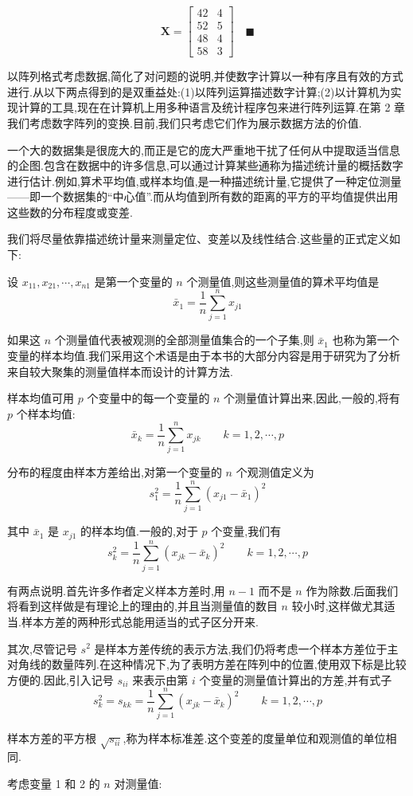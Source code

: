 \[
\bm{X} =
\begin{bmatrix}
42 & 4 \\
52 & 5 \\
48 & 4 \\
58 & 3
\end{bmatrix}
\quad\blacksquare
\]

以阵列格式考虑数据,简化了对问题的说明,并使数字计算以一种有序且有效的方式进行.从以下两点得到的是双重益处:(1)以阵列运算描述数字计算;(2)以计算机为实现计算的工具,现在在计算机上用多种语言及统计程序包来进行阵列运算.在第 2 章我们考虑数字阵列的变换.目前,我们只考虑它们作为展示数据方法的价值.


一个大的数据集是很庞大的,而正是它的庞大严重地干扰了任何从中提取适当信息的企图.包含在数据中的许多信息,可以通过计算某些通称为描述统计量的概括数字进行估计.例如,算术平均值,或样本均值,是一种描述统计量,它提供了一种定位测量——即一个数据集的“中心值”.而从均值到所有数的距离的平方的平均值提供出用这些数的分布程度或变差.

我们将尽量依靠描述统计量来测量定位、变差以及线性结合.这些量的正式定义如下:

设 $x_{11},x_{21},\cdots,x_{n1}$ 是第一个变量的 $n$ 个测量值,则这些测量值的算术平均值是
\[
\bar{x}_1 = \frac{1}{n}\sum_{j=1}^{n} x_{j1}
\]

如果这 $n$ 个测量值代表被观测的全部测量值集合的一个子集,则 $\bar{x}_1$ 也称为第一个变量的样本均值.我们采用这个术语是由于本书的大部分内容是用于研究为了分析来自较大聚集的测量值样本而设计的计算方法.

样本均值可用 $p$ 个变量中的每一个变量的 $n$ 个测量值计算出来,因此,一般的,将有 $p$ 个样本均值:
\label{eq:1-1}
\begin{equation}
\bar{x}_k = \frac{1}{n}\sum_{j=1}^{n} x_{jk} \qquad k=1,2,\cdots,p \tag{1-1}
\end{equation}

分布的程度由样本方差给出,对第一个变量的 $n$ 个观测值定义为
\[
s_1^2 = \frac{1}{n}\sum_{j=1}^{n}(x_{j1}-\bar{x}_1)^2
\]

其中 $\bar{x}_1$ 是 $x_{j1}$ 的样本均值.一般的,对于 $p$ 个变量,我们有
\label{eq:1-2}
\begin{equation}
s_k^2 = \frac{1}{n}\sum_{j=1}^{n}(x_{jk}-\bar{x}_k)^2 \qquad k=1,2,\cdots,p \tag{1-2}
\end{equation}

有两点说明.首先许多作者定义样本方差时,用 $n-1$ 而不是 $n$ 作为除数.后面我们将看到这样做是有理论上的理由的,并且当测量值的数目 $n$ 较小时,这样做尤其适当.样本方差的两种形式总能用适当的式子区分开来.

其次,尽管记号 $s^2$ 是样本方差传统的表示方法,我们仍将考虑一个样本方差位于主对角线的数量阵列.在这种情况下,为了表明方差在阵列中的位置,使用双下标是比较方便的.因此,引入记号 $s_{ii}$ 来表示由第 $i$ 个变量的测量值计算出的方差,并有式子
\label{eq:1-3}
\begin{equation}
s_k^2 = s_{kk} = \frac{1}{n}\sum_{j=1}^{n}(x_{jk}-\bar{x}_k)^2 \qquad k=1,2,\cdots,p \tag{1-3}
\end{equation}

样本方差的平方根 $\sqrt{s_{ii}}$,称为样本标准差.这个变差的度量单位和观测值的单位相同.

考虑变量 1 和 2 的 $n$ 对测量值:
